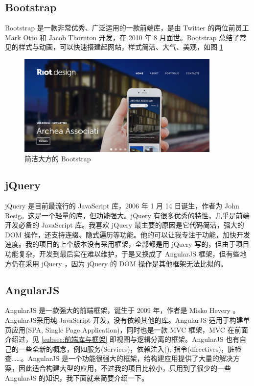 \documentclass[UTF8]{ctexbook}
\begin{document}
{{        \subsection{Bootstrap}
          \label{subsec:Bootstrap}
            Bootstrap 是一款非常优秀、广泛运用的一款前端库，是由 Twitter 的两位前员工 Mark Otto 和 Jacob Thornton 开发，在 2010 年 8 月面世。Bootstrap 总结了常见的样式与动画，可以快速搭建起网站，样式简洁、大气、美观，如图 \ref{fig:bootstrap}
            \begin{figure}[H]
              \centering
              \includegraphics[width=10cm]{./img/bootstrap.png}
              \caption{简洁大方的 Bootstrap}
              \label{fig:bootstrap}
            \end{figure}

        \subsection{jQuery}
          \label{subsec:jquery}
            jQuery 是目前最流行的 JavaScript 库，2006 年 1 月 14 日诞生，作者为 John Resig。这是一个轻量的库，但功能强大。jQuery 有很多优秀的特性，几乎是前端开发必备的 JavaScript 库。我喜欢 jQuery 最主要的原因是它代码简洁，强大的 DOM 操作，还支持连缀、隐式遍历等功能。他的可以让我专注于功能，加快开发速度。我的项目的上个版本没有采用框架，全部都是用 jQuery 写的，但由于项目功能复杂，开发到最后实在难以维护，于是又换成了 AngularJS 框架，但有些地方仍在采用 jQuery ，因为 jQuery 的 DOM 操作是其他框架无法比拟的。

        \subsection{AngularJS}
          \label{subsec:angularjs}
            AngularJS 是一款强大的前端框架，诞生于 2009 年，作者是 Misko Hevery 。AngularJS采用纯 JavaScript 开发，没有依赖其他的库。AngularJS 适用于构建单页应用(SPA, Single Page Application)，同时也是一款 MVC 框架，MVC 在前面介绍过，见 \ref{subsec:前端库与框架}  即视图与逻辑分离的框架。AngularJS 也有自己的一些全新的概念，例如服务(Services)，依赖注入(), 指令(directives)，脏检查……。AngularJS 是一个功能很强大的框架，给构建应用提供了大量的解决方案，因此适合构建大型的应用，不过我的项目比较小，只用到了很少的一些 AngularJS 的知识，我下面就来简要介绍一下。
}}
\end{document}
